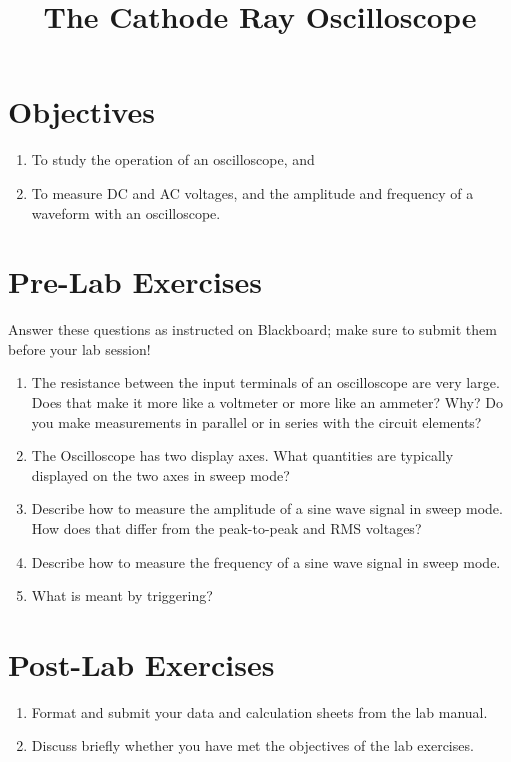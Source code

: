 \documentclass[12pt]{article}
\title{The Cathode Ray Oscilloscope}
\author{}
\date{}
\begin{document}
\maketitle

\section{Objectives}
\label{sec:objectives}

\begin{enumerate}
\item To study the operation of an oscilloscope, and
\item To measure DC and AC voltages, and the amplitude and frequency
  of a waveform with an oscilloscope.
\end{enumerate}


\section*{Pre-Lab Exercises}

Answer these questions as instructed on Blackboard; make sure to
submit them before your lab session!

\begin{enumerate}
\item The resistance between the input terminals of an oscilloscope
  are very large.  Does that make it more like a voltmeter or more
  like an ammeter?  Why?  Do you make measurements in parallel or in
  series with the circuit elements?
\item The Oscilloscope has two display axes.  What quantities are
  typically displayed on the two axes in sweep mode?
\item Describe how to measure the amplitude of a sine wave signal in
  sweep mode.  How does that differ from the peak-to-peak and RMS
  voltages? 
\item Describe how to measure the frequency of a sine wave signal in
  sweep mode.
\item What is meant by triggering?
\end{enumerate}

\newpage

\section*{Post-Lab Exercises}

\begin{enumerate}
\item Format and submit your data and calculation sheets from the lab
  manual.
\item Discuss briefly whether you have met the objectives of the lab
  exercises. 
\end{enumerate}
\end{document}
